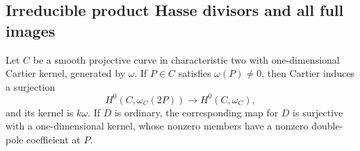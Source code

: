 \subsection{Irreducible product Hasse divisors and all full images}
\label{subsec:product-hasse-tacnode}

\begin{lemma}
\label{lem:pointed-Cartier}
Let $C$ be a smooth projective curve in characteristic two with
one-dimensional Cartier kernel, generated by $\omega$.
If $P\in C$ satisfies $\omega(P)\ne0$, then Cartier induces a
surjection
\[
 H^0(C,\omega_C(2P))\longrightarrow H^0(C,\omega_C),
\]
and its kernel is $k\omega$. If $D$ is ordinary, the corresponding
map for $D$ is surjective with a one-dimensional kernel, whose
nonzero members have a nonzero double-pole coefficient at $P$.
\end{lemma}


